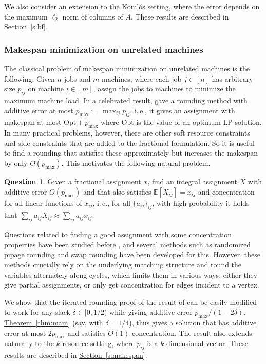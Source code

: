 \documentclass[11pt]{article}
\newcommand{\E}{\mathbb{E}}
\theoremstyle{definition}
\newcommand{\expref}[2]{\texorpdfstring{\hyperref[#2]{#1~\ref{#2}}}{#1~\ref{#2}}}
\newcommand{\ie}{i.\,e.}
\newtheorem{question}[theorem]{Question}
\begin{document}
We also consider an extension to the Koml\'{o}s setting, where the error depends on the maximum $\ell_2$ norm of columns of $A$.
These results are described in \expref{Section}{s:bf}.

%
%

%


\subsubsection{Makespan minimization on unrelated machines}
%
The classical problem of makespan minimization on unrelated machines is the following. Given $n$ jobs and $m$ machines, where each job $j \in [n]$ has arbitrary size $p_{ij}$ on machine $i\in [m]$, assign the jobs to machines to minimize the maximum machine load. In a celebrated result, \cite{LST} gave a rounding method with additive error at most $p_{\max} := \max_{ij} p_{ij}$,
\ie, it gives an assignment with makespan at most $\text{Opt} + p_{\max}$ where
$\text{Opt}$ is the value of an optimum LP solution.
In many practical problems, however, there are other soft resource constraints and side constraints that are added to the  fractional formulation.
So it is useful to find a rounding that satisfies these approximately but increases the makespan by only $O(p_{\max})$.
This motivates the following natural problem.

\begin{question}
Given a fractional assignment $x$, find an integral assignment $X$ with additive error $O(p_{\max})$ and that also satisfies $\E[X_{ij}]=x_{ij}$ and
concentration for all linear functions of $x_{ij}$, \ie, for all $\{a_{ij}\}_{ij}$,  with high probability it holds that $\sum_{ij} a_{ij} X_{ij} \approx \sum_{ij} a_{ij} x_{ij}$.
\end{question}


Questions related to finding a good assignment with some concentration properties have been studied before \cite{GKPS06,AFK,CVZ11}, and several methods such as randomized pipage rounding and swap rounding have been developed for this.
However, these methods crucially rely on the underlying matching structure and round the variables alternately along cycles, which limits them in various ways: either they give partial assignments, or only get concentration for edges incident to a vertex.


 We show that the iterated rounding proof of the result of \cite{LST} can be easily modified to  work for any slack $\delta \in [0,1/2)$ while giving additive error $p_{\max}/(1-2\delta)$. 
\expref{Theorem}{thm:main} (say, with $\delta=1/4$), thus gives a solution that 
has additive error at most
$2p_{\max}$ and satisfies $O(1)$-concentration.
The result also extends naturally to the $k$-resource setting, where $p_{ij}$ is a $k$-dimensional vector. These results are described in \expref{Section}{s:makespan}.
\end{document}
